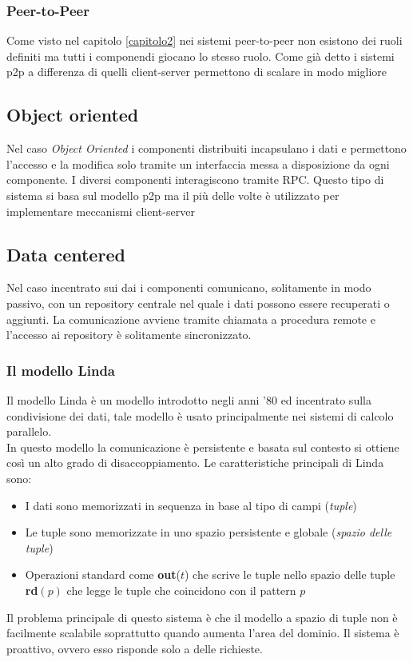 \subsubsection{Peer-to-Peer}
Come visto nel capitolo \ref{capitolo2} nei sistemi peer-to-peer non esistono dei ruoli definiti ma tutti i componendi giocano lo stesso ruolo. Come già detto i sistemi p2p a differenza di quelli client-server permettono di scalare in modo migliore
\subsection{Object oriented}
Nel caso \emph{Object Oriented} i componenti distribuiti incapsulano i dati e permettono l'accesso e la modifica solo tramite un interfaccia messa a disposizione da ogni componente. I diversi componenti interagiscono tramite RPC.
Questo tipo di sistema si basa sul modello p2p ma il più delle volte è utilizzato per implementare meccanismi client-server
\subsection{Data centered}
Nel caso incentrato sui dai i componenti comunicano, solitamente in modo passivo, con un repository centrale nel quale i dati possono essere recuperati o aggiunti. La comunicazione avviene tramite chiamata a procedura remote e l'accesso ai repository è solitamente sincronizzato.
\subsubsection{Il modello Linda}
Il modello Linda è un modello introdotto negli anni '80 ed incentrato sulla condivisione dei dati, tale modello è usato principalmente nei sistemi di calcolo parallelo.\\
In questo modello la comunicazione è persistente e basata sul contesto si ottiene così un alto grado di disaccoppiamento.
Le caratteristiche principali di Linda sono:
\begin{itemize}
\item I dati sono memorizzati in sequenza in base al tipo di campi (\emph{tuple})
\item Le tuple sono memorizzate in uno spazio persistente e globale (\emph{spazio delle tuple})
\item Operazioni standard come \textbf{out}($t$) che scrive le tuple nello spazio delle tuple \textbf{rd}$(p)$ che legge le tuple che coincidono con il pattern $p$ 
\end{itemize}
Il problema principale di questo sistema è che il modello a spazio di tuple non è facilmente scalabile soprattutto quando aumenta l'area del dominio. Il sistema è proattivo, ovvero esso risponde solo a delle richieste.
